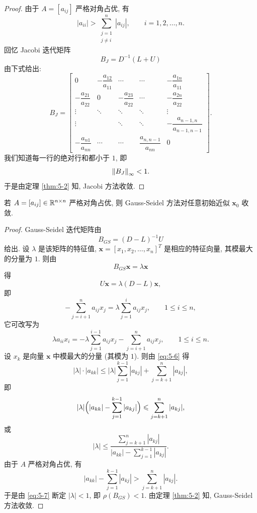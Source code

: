 \begin{proof}
由于 $A=[a_{ij}]$ 严格对角占优, 有
\[
  |a_{ii}|>\sum_{\substack{j=1\\ j\neq i}}^{n}|a_{ij}|,
  \qquad i=1,2,\ldots,n.
\]
回忆 Jacobi 迭代矩阵
\[
  B_J=D^{-1}(L+U)
\]
由下式给出:
\[
  B_J=
  \begin{bmatrix}
    0 & -\dfrac{a_{12}}{a_{11}} & \cdots & \cdots & -\dfrac{a_{1n}}{a_{11}}\\[8pt]
    -\dfrac{a_{21}}{a_{22}} & 0 & -\dfrac{a_{23}}{a_{22}} & \cdots & -\dfrac{a_{2n}}{a_{22}}\\[8pt]
    \vdots & \ddots & \ddots & \ddots & \vdots\\[2pt]
    \vdots & & \ddots & \ddots & -\dfrac{a_{n-1,n}}{a_{n-1,n-1}}\\[8pt]
    -\dfrac{a_{n1}}{a_{nn}} & \cdots & \cdots & \dfrac{a_{n,n-1}}{a_{nn}} & 0
  \end{bmatrix}.
\]
我们知道每一行的绝对行和都小于 $1$, 即
\[
  \left\|B_J\right\|_\infty<1.
\]
于是由定理 \ref{thm:5-2} 知, Jacobi 方法收敛.
\end{proof}

\begin{theorem}
\label{thm:5-4}
若 $A=[a_{ij}]\in\mathbb{R}^{n\times n}$ 严格对角占优, 则 Gauss-Seidel 方法对任意初始近似 $\mathbf{x}_0$ 收敛.
\end{theorem}

\begin{proof}
Gauss-Seidel 迭代矩阵由
\[
  B_{GS}=(D-L)^{-1}U
\]
给出. 设 $\lambda$ 是该矩阵的特征值, $\mathbf{x}=[x_1,x_2,\ldots,x_n]^T$ 是相应的特征向量, 其模最大的分量为 $1$. 则由
\[
  B_{GS}\mathbf{x}=\lambda\mathbf{x}
\]
得
\[
  U\mathbf{x}=\lambda(D-L)\mathbf{x},
\]
即
\[
  -\sum_{j=i+1}^{n}a_{ij}x_j=\lambda\sum_{j=1}^{i}a_{ij}x_j,
  \qquad 1\leqslant i\leqslant n,
\]
它可改写为
\begin{equation}
  \lambda a_{ii}x_i=-\lambda\sum_{j=1}^{i-1}a_{ij}x_j-\sum_{j=i+1}^{n}a_{ij}x_j,
  \qquad 1\leqslant i\leqslant n.
  \label{eq:5-6}
\end{equation}
设 $x_k$ 是向量 $\mathbf{x}$ 中模最大的分量 (其模为 $1$). 则由 \eqref{eq:5-6} 得
\[
  |\lambda|\cdot|a_{kk}|\leqslant|\lambda|\sum_{j=1}^{k-1}|a_{kj}|+\sum_{j=k+1}^{n}|a_{kj}|,
\]
即
\[
  |\lambda|\Bigl(|a_{kk}|-\sum_{j=1}^{k-1}|a_{kj}|\Bigr)\leqslant\sum_{j=k+1}^{n}|a_{kj}|,
\]
或
\begin{equation}
  |\lambda|\leqslant
  \frac{\displaystyle\sum_{j=k+1}^{n}|a_{kj}|}
       {\displaystyle|a_{kk}|-\sum_{j=1}^{k-1}|a_{kj}|}.
  \label{eq:5-7}
\end{equation}
由于 $A$ 严格对角占优, 有
\[
  |a_{kk}|-\sum_{j=1}^{k-1}|a_{kj}|>\sum_{j=k+1}^{n}|a_{kj}|.
\]
于是由 \eqref{eq:5-7} 断定 $|\lambda|<1$, 即 $\rho(B_{GS})<1$. 由定理 \ref{thm:5-2} 知, Gauss-Seidel 方法收敛.
\end{proof}

